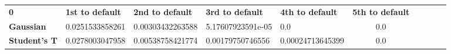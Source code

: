 \begin{center}
 \begin{tabular}{|l|l|l|l|l|c|c|c|c|c|}
\hline
\textbf{0} & \textbf{1st to default} & \textbf{2nd to default} & \textbf{3rd to default} & \textbf{4th to default} & \textbf{5th to default}\\\hhline{|=|=|=|=|=|=|}
\textbf{Gaussian} & 0.0251533858261 & 0.00303432263588 & 5.17607923591e-05 & 0.0 & 0.0\\
\textbf{Student's T} & 0.0278003047958 & 0.00538758421774 & 0.00179750746556 & 0.00024713645399 & 0.0\\
\hline
\end{tabular}
\end{center}